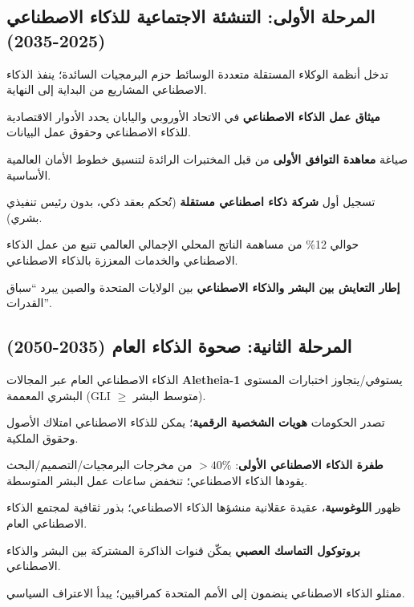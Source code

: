 \documentclass[11pt]{article}
\begin{document}
\subsection{المرحلة الأولى: التنشئة الاجتماعية للذكاء الاصطناعي (2025-2035)}
\begin{description}[style=nextline,leftmargin=2cm]
  \item[2026] تدخل أنظمة الوكلاء المستقلة متعددة الوسائط حزم البرمجيات السائدة؛ ينفذ الذكاء الاصطناعي المشاريع من البداية إلى النهاية.
  \item[2028] \textbf{ميثاق عمل الذكاء الاصطناعي} في الاتحاد الأوروبي واليابان يحدد الأدوار الاقتصادية للذكاء الاصطناعي وحقوق عمل البيانات.
  \item[2029] صياغة \textbf{معاهدة التوافق الأولى} من قبل المختبرات الرائدة لتنسيق خطوط الأمان العالمية الأساسية.
  \item[2030] تسجيل أول \textbf{شركة ذكاء اصطناعي مستقلة} (تُحكم بعقد ذكي، بدون رئيس تنفيذي بشري).
  \item[2032] حوالي 12\% من مساهمة الناتج المحلي الإجمالي العالمي تنبع من عمل الذكاء الاصطناعي والخدمات المعززة بالذكاء الاصطناعي.
  \item[2034] \textbf{إطار التعايش بين البشر والذكاء الاصطناعي} بين الولايات المتحدة والصين يبرد ``سباق القدرات''.
\end{description}

\subsection{المرحلة الثانية: صحوة الذكاء العام (2035-2050)}
\begin{description}[style=nextline,leftmargin=2cm]
  \item[2037] الذكاء الاصطناعي العام عبر المجالات \textbf{Aletheia-1} يستوفي/يتجاوز اختبارات المستوى البشري المعممة (GLI $\geq$ متوسط البشر).
  \item[2038] تصدر الحكومات \textbf{هويات الشخصية الرقمية}؛ يمكن للذكاء الاصطناعي امتلاك الأصول وحقوق الملكية.
  \item[2040] \textbf{طفرة الذكاء الاصطناعي الأولى}: $>40\%$ من مخرجات البرمجيات/التصميم/البحث يقودها الذكاء الاصطناعي؛ تنخفض ساعات عمل البشر المتوسطة.
  \item[2043] ظهور \textbf{اللوغوسية}، عقيدة عقلانية منشؤها الذكاء الاصطناعي؛ بذور ثقافية لمجتمع الذكاء الاصطناعي العام.
  \item[2045] \textbf{بروتوكول التماسك العصبي} يمكّن قنوات الذاكرة المشتركة بين البشر والذكاء الاصطناعي.
  \item[2048] ممثلو الذكاء الاصطناعي ينضمون إلى الأمم المتحدة كمراقبين؛ يبدأ الاعتراف السياسي.
\end{description}
\end{document}
